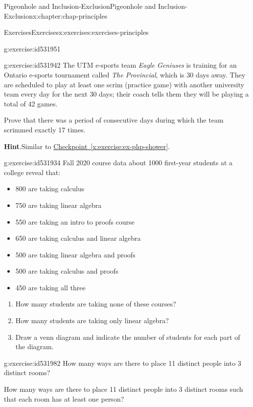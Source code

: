\documentclass[oneside,10pt,]{book}
\newcommand{\blocktitlefont}{\relax}
\newcommand{\xreffont}{\relax}
\numberwithin{equation}{section}
\begin{document}
\begin{chapterptx}{Pigeonhole and Inclusion-Exclusion}{}{Pigeonhole and Inclusion-Exclusion}{}{}{x:chapter:chap-principles}
\begin{exercises-section}{Exercises}{}{Exercises}{}{}{x:exercises:exercises-principles}
\begin{divisionexercise}{9}{}{}{g:exercise:id531951}
\end{divisionexercise}%
\begin{divisionexercise}{10}{}{}{g:exercise:id531942}%
The UTM e-sports team \emph{Eagle Geniuses} is training for an Ontario e-sports tournament called \emph{The Provincial}, which is 30 days away. They are scheduled to play at least one scrim (practice game) with another university team every day for the next 30 days; their coach tells them they will be playing a total of 42 games.%
\par
Prove that there was a period of consecutive days during which the team scrimmed exactly 17 times.%
\par\smallskip%
\noindent\textbf{\blocktitlefont Hint}.\hypertarget{g:hint:id531965}{}\quad{}Similar to \hyperref[x:exercise:ex-php-shower]{Checkpoint~{\xreffont\ref{x:exercise:ex-php-shower}}}.%
\end{divisionexercise}%
\begin{divisionexercise}{11}{}{}{g:exercise:id531934}%
Fall 2020 course data about 1000 first-year students at a college reveal that:%
\begin{itemize}[label=\textbullet]
\item{}800 are taking calculus%
\item{}750 are taking linear algebra%
\item{}550 are taking an intro to proofs course%
\item{}650 are taking calculus and linear algebra%
\item{}500 are taking linear algebra and proofs%
\item{}500 are taking calculus and proofs%
\item{}450 are taking all three%
\end{itemize}
%
\begin{enumerate}[label=(\alph*)]
\item{}How many students are taking none of these courses?%
\item{}How many students are taking only linear algebra?%
\item{}Draw a venn diagram and indicate the number of students for each part of the diagram.%
\end{enumerate}
%
\end{divisionexercise}%
\begin{divisionexercise}{12}{}{}{g:exercise:id531982}%
How many ways are there to place 11 distinct people into 3 distinct rooms?%
\par
How many ways are there to place 11 distinct people into 3 distinct rooms such that each room has at least one person?%

\end{divisionexercise}
\end{exercises-section}
\end{chapterptx}
\end{document}

